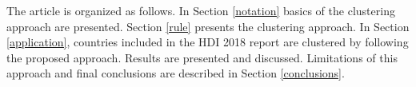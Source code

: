 \documentclass[]{elsarticle}
\theoremstyle{definition}
\begin{document}
The article is organized as follows. In Section \ref{notation} basics of the clustering approach are presented. Section \ref{rule} presents the clustering approach. In Section \ref{application},  countries included in the HDI 2018 report are clustered by following the proposed approach.  Results are presented and discussed.  Limitations of this approach and final conclusions are described in Section \ref{conclusions}.

%
%
%
%
%
%
%
\end{document}
